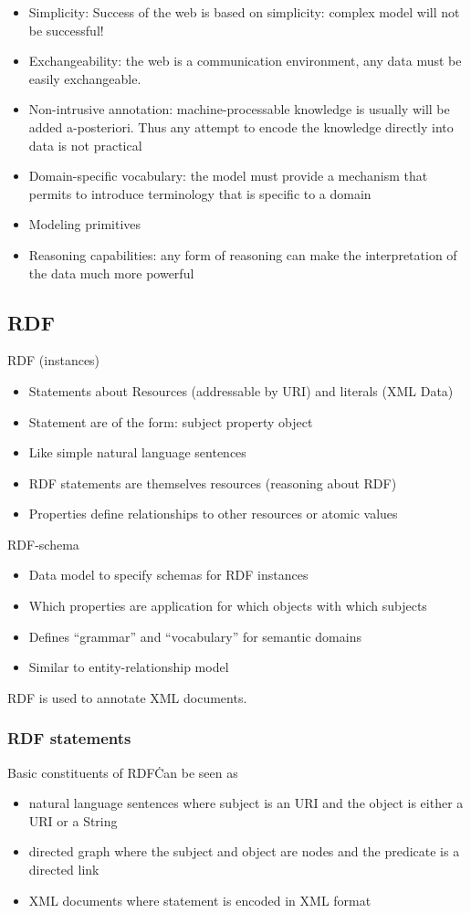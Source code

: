 \begin{itemize}
\item Simplicity: Success of the web is based on simplicity: complex
  model will not be successful!
\item Exchangeability: the web is a communication environment, any
  data must be easily exchangeable.
\item Non-intrusive annotation: machine-processable knowledge is
  usually will be added a-posteriori. Thus any attempt to encode the
  knowledge directly into data is not practical
\item Domain-specific vocabulary: the model must provide a mechanism
  that permits to introduce terminology that is specific to a domain
\item Modeling primitives
\item Reasoning capabilities: any form of reasoning can make the
  interpretation of the data much more powerful
\end{itemize}

\subsection{RDF}
RDF (instances)
\begin{itemize}
\item Statements about Resources (addressable by URI) and literals
  (XML Data)
\item Statement are of the form: subject property object
\item Like simple natural language sentences
\item RDF statements are themselves resources (reasoning about RDF)
\item Properties define relationships to other resources or atomic
  values
\end{itemize}

RDF-schema
\begin{itemize}
\item Data model to specify schemas for RDF instances
\item Which properties are application for which objects with which
  subjects
\item Defines ``grammar'' and ``vocabulary'' for semantic domains
\item Similar to entity-relationship model
\end{itemize}

RDF is used to annotate XML documents.

\subsubsection{RDF statements}
Basic constituents of RDF\. Can be seen as
\begin{itemize}
\item natural language sentences where subject is an URI and the
  object is either a URI or a String
\item directed graph where the subject and object are nodes and the
  predicate is a directed link
\item XML documents where statement is encoded in XML format
\end{itemize}

